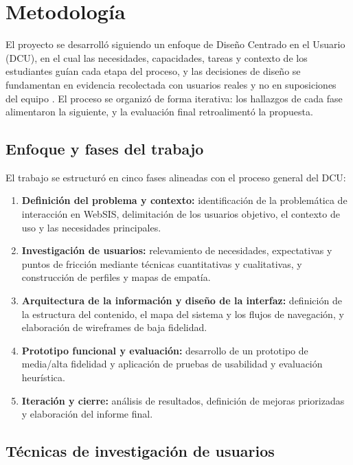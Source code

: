 \section{Metodología}

El proyecto se desarrolló siguiendo un enfoque de Diseño Centrado en el Usuario (DCU), en el cual las necesidades, capacidades, tareas y contexto de los estudiantes guían cada etapa del proceso, y las decisiones de diseño se fundamentan en evidencia recolectada con usuarios reales y no en suposiciones del equipo \autocite{iso9241}. El proceso se organizó de forma iterativa: los hallazgos de cada fase alimentaron la siguiente, y la evaluación final retroalimentó la propuesta.

\subsection{Enfoque y fases del trabajo}

El trabajo se estructuró en cinco fases alineadas con el proceso general del DCU:

\begin{enumerate}
  \item \textbf{Definición del problema y contexto:} identificación de la problemática de interacción en WebSIS, delimitación de los usuarios objetivo, el contexto de uso y las necesidades principales.
  \item \textbf{Investigación de usuarios:} relevamiento de necesidades, expectativas y puntos de fricción mediante técnicas cuantitativas y cualitativas, y construcción de perfiles y mapas de empatía.
  \item \textbf{Arquitectura de la información y diseño de la interfaz:} definición de la estructura del contenido, el mapa del sistema y los flujos de navegación, y elaboración de wireframes de baja fidelidad.
  \item \textbf{Prototipo funcional y evaluación:} desarrollo de un prototipo de media/alta fidelidad y aplicación de pruebas de usabilidad y evaluación heurística.
  \item \textbf{Iteración y cierre:} análisis de resultados, definición de mejoras priorizadas y elaboración del informe final.
\end{enumerate}

\subsection{Técnicas de investigación de usuarios}

